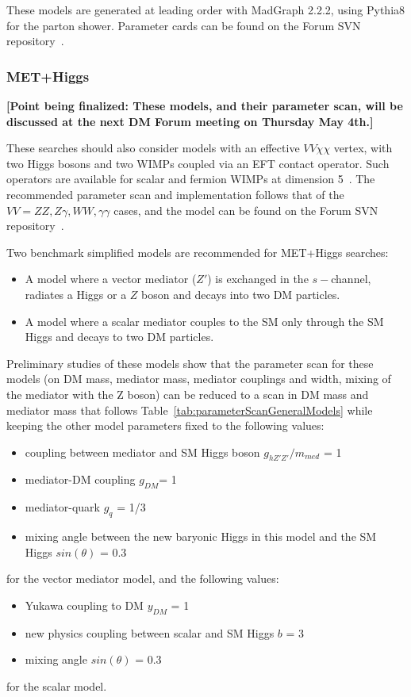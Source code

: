 \documentclass[a4,debug,notitlepage,nobib]{tufte-handout}
\newcommand{\mmed}{\ensuremath{m_{med}}\xspace}
\newcommand{\gdm}{\ensuremath{g_{DM}}\xspace}
\begin{document}
These models are generated at leading
order with MadGraph 2.2.2, using Pythia8 for the parton shower.
Parameter cards can be found on the Forum SVN repository~\cite{ForumSVN_EWEFTD7}.


\subsubsection{MET+Higgs} 

\textbf{[Point being finalized: These models, and their parameter scan, will be
discussed at the next DM Forum meeting on Thursday May 4th.]}

These searches should also consider models with an
effective $VV\chi\chi$ vertex, with two Higgs bosons and two WIMPs coupled
via an EFT contact operator. Such operators are available for scalar
and fermion WIMPs at dimension 5~\cite{Carpenter:2013xra}. The
recommended parameter scan and implementation follows that of the $VV=ZZ,Z \gamma,WW,\gamma \gamma$
cases, and the model can be found on the Forum SVN repository~\cite{ForumSVN_monoHEFTD5}.

Two benchmark simplified models \cite{Carpenter:2013xra} 
are recommended for MET+Higgs searches:
\begin{itemize}
 \item A model where a vector mediator ($Z'$) is exchanged in the $s-$channel, 
 radiates a Higgs or a $Z$ boson and decays into two DM particles. 
 \item A model where a scalar mediator couples to the SM only 
 through the SM Higgs and decays to two DM particles. 
\end{itemize}

Preliminary studies of these models show that the parameter scan for 
these models (on DM mass, mediator mass, mediator couplings and
width, mixing of the mediator with the Z boson) can be reduced to 
a scan in DM mass and mediator mass that follows Table~\ref{tab:parameterScanGeneralModels} while keeping 
the other model parameters fixed to the following values: 
\begin{itemize}
 \item coupling between mediator and SM Higgs boson $g_{hZ'Z'}/ \mmed$ = 1
 \item mediator-DM coupling \gdm = 1
 \item mediator-quark $g_{q}$ = 1/3
 \item mixing angle between the new baryonic Higgs in this model and the SM Higgs $sin(\theta)$ = 0.3
\end{itemize}
for the vector mediator model, and the following values: 
\begin{itemize}
 \item Yukawa coupling to DM $y_{DM}$ = 1
 \item new physics coupling between scalar and SM Higgs $b$ = 3
 \item mixing angle $sin(\theta)$ = 0.3
\end{itemize}
for the scalar model. 
\end{document}
